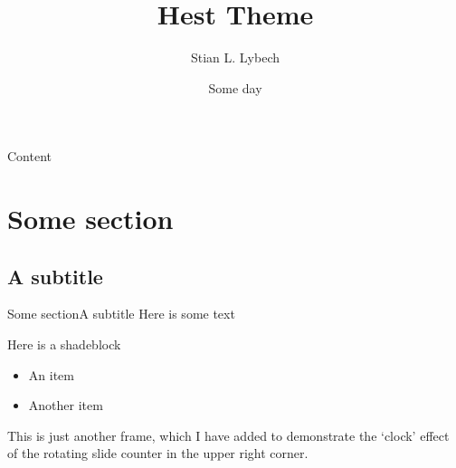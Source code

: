 \documentclass[10pt,xcolor={dvipsnames}]{beamer}
\title[Hest Beamer Theme]{Hest Theme}
\subtitle[]{}
\author[Stian L. Lybech]{Stian L. Lybech}
\institute[]{Somewhere}
\date{Some day}
\begin{document}
\begin{frame} 
  \titlepage
\end{frame}

\begin{frame}{Content}{}
  \tableofcontents
\end{frame}

\section{Some section}
\subsection{A subtitle}
\begin{frame}{Some section}{A subtitle}
Here is some text
  \begin{shadeblock}{Here is a shadeblock}
    \begin{itemize}
      \item An item
      \item Another item
    \end{itemize}
  \end{shadeblock}
\end{frame}

\begin{frame}
This is just another frame, which I have added to demonstrate the `clock' effect of the rotating slide counter in the upper right corner.
\end{frame}

\begin{frame}
\end{frame}
\end{document}
